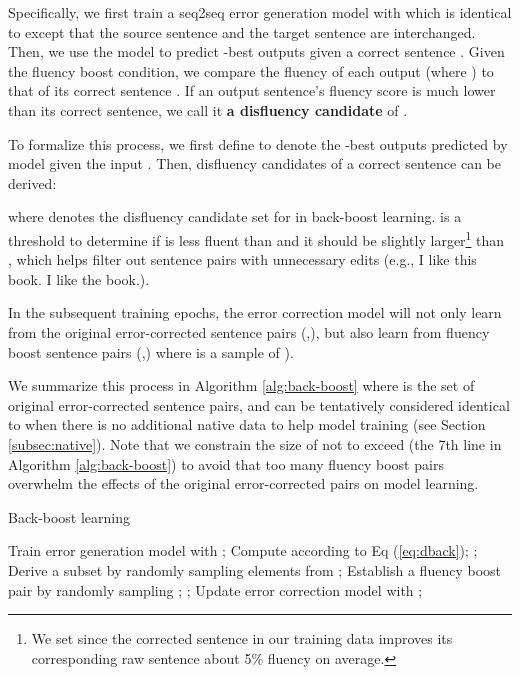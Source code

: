 \documentclass{article} \usepackage{MSRA_TR,times}
\begin{document}
Specifically, we first train a seq2seq error generation model  with  which is identical to  except that the source sentence and the target sentence are interchanged. Then, we use the model  to predict -best outputs  given a correct sentence . Given the fluency boost condition, we compare the fluency of each output  (where ) to that of its correct sentence . If an output sentence's fluency score is much lower than its correct sentence, we call it \textbf{a disfluency candidate} of .

To formalize this process, we first define  to denote the -best outputs predicted by model  given the input . Then, disfluency candidates of a correct sentence  can be derived:

\vspace{-0.2cm}


\noindent where  denotes the disfluency candidate set for  in back-boost learning.  is a threshold to determine if  is less fluent than  and it should be slightly larger\footnote{We set  since the corrected sentence in our training data improves its corresponding raw sentence about 5\% fluency on average.} than , which helps filter out sentence pairs with unnecessary edits (e.g., I like this book.  I like the book.).

In the subsequent training epochs, the error correction model will not only learn from the original error-corrected sentence pairs (,), but also learn from fluency boost sentence pairs (,) where  is a sample of ).

We summarize this process in Algorithm \ref{alg:back-boost} where  is the set of original error-corrected sentence pairs, and  can be tentatively considered identical to  when there is no additional native data to help model training (see Section \ref{subsec:native}). Note that we constrain the size of  not to exceed  (the 7th line in Algorithm \ref{alg:back-boost}) to avoid that too many fluency boost pairs overwhelm the effects of the original error-corrected pairs on model learning.

\begin{algorithm}[t]
\centering
\caption{Back-boost learning\label{alg:back-boost}}
\begin{algorithmic}[1]
\State Train error generation model  with ;
\State Compute  according to Eq (\ref{eq:dback});
\EndFor
{}
\State ;
\State Derive a subset  by randomly sampling  elements from ;
\State Establish a fluency boost pair  by randomly sampling ;
\State ;
\EndFor
\State Update error correction model  with ;
\EndFor
\end{algorithmic}
\end{algorithm}
\end{document}
